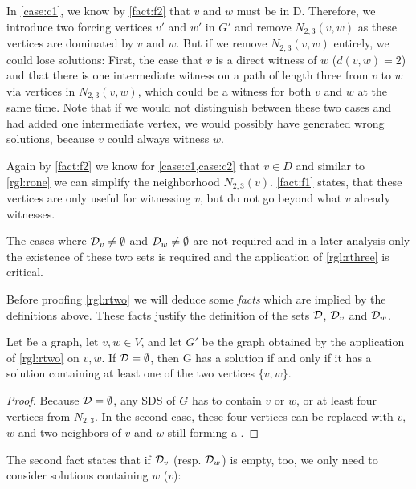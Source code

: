 In \cref{case:c1}, we know by \cref{fact:f2} that $v$ and $w$ must be in D. Therefore, we introduce two forcing vertices $v'$ and $w'$ in $G'$ and remove $N_{2,3}(v,w)$ as these vertices are dominated by $v$ and $w$.
But if we remove $N_{2,3}(v,w)$ entirely, we could lose solutions: First, the case that $v$ is a direct witness of $w$ ($d(v,w) = 2$) and that there is one intermediate witness on a path of length three from $v$ to $w$ via vertices in $N_{2,3}(v,w)$, which could be a witness for both $v$ and $w$ at the same time. Note that if we would not distinguish between these two cases and had added one intermediate vertex, we would possibly have generated wrong solutions, because $v$ could always witness $w$.


Again by \cref{fact:f2} we know for \cref{case:c1,case:c2} that $v \in D$ and similar to \cref{rgl:rone} we can simplify the neighborhood $N_{2,3}(v)$. \cref{fact:f1} states, that these vertices are only useful for witnessing $v$, but do not go beyond what $v$ already witnesses.

The cases where $\mathcal{D}_{v} \neq \emptyset$ and $\mathcal{D}_{w} \neq \emptyset$ are not required and in a later analysis only the existence of these two sets is required and the application of \cref{rgl:rthree} is critical.

Before proofing \cref{rgl:rtwo} we will deduce some \textit{facts} which are implied by the definitions above. These facts justify the definition of the sets $\mathcal{D}$, $\mathcal{D}_{v}$ and $\mathcal{D}_{w}$.

\begin{fact}\label{fact:f1}
    Let \G be a graph, let $v,w \in V$, and let $G'$ be the graph obtained by the application of \cref{rgl:rtwo} on $v,w$. If $\mathcal{D} = \emptyset$, then G has a solution if and only if it has a solution containing at least one of the two vertices $\{v,w \}$.
\end{fact}
\begin{proof}
Because $\mathcal{D} = \emptyset$, any SDS of $G$ has to contain $v$ or $w$, or at least four vertices from $N_{2,3}$. In the second case, these four vertices can be replaced with $v$, $w$ and two neighbors of $v$ and $w$ still forming a \sdom.
\end{proof}

The second fact states that if  $\mathcal{D}_{v}$ (resp. $\mathcal{D}_{w}$) is empty, too, we only need to consider solutions containing $w$ ($v$):

